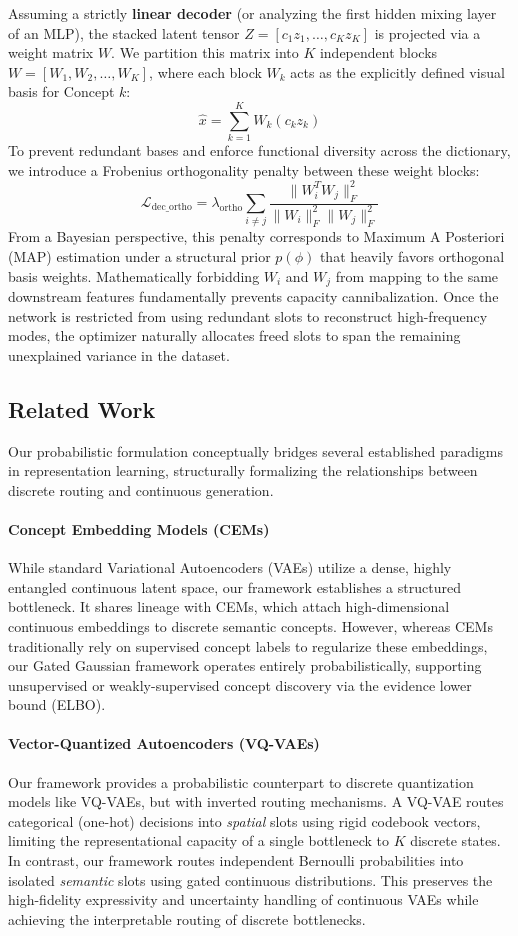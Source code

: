 \documentclass[11pt, a4paper]{article}
\begin{document}
Assuming a strictly \textbf{linear decoder} (or analyzing the first hidden mixing layer of an MLP), the stacked latent tensor $Z = [c_1 z_1, \dots, c_K z_K]$ is projected via a weight matrix $W$. We partition this matrix into $K$ independent blocks $W = [W_1, W_2, \dots, W_K]$, where each block $W_k$ acts as the explicitly defined visual basis for Concept $k$:
\[
\hat{x} = \sum_{k=1}^K W_k (c_k z_k)
\]
To prevent redundant bases and enforce functional diversity across the dictionary, we introduce a Frobenius orthogonality penalty between these weight blocks:
\[
\mathcal{L}_{\text{dec\_ortho}} = \lambda_{\text{ortho}} \sum_{i \neq j} \frac{\| W_i^T W_j \|_F^2}{\|W_i\|_F^2 \|W_j\|_F^2}
\]
From a Bayesian perspective, this penalty corresponds to Maximum A Posteriori (MAP) estimation under a structural prior $p(\phi)$ that heavily favors orthogonal basis weights. Mathematically forbidding $W_i$ and $W_j$ from mapping to the same downstream features fundamentally prevents capacity cannibalization. Once the network is restricted from using redundant slots to reconstruct high-frequency modes, the optimizer naturally allocates freed slots to span the remaining unexplained variance in the dataset.

\subsection{Related Work}

Our probabilistic formulation conceptually bridges several established paradigms in representation learning, structurally formalizing the relationships between discrete routing and continuous generation.

\paragraph{Concept Embedding Models (CEMs)}
While standard Variational Autoencoders (VAEs) utilize a dense, highly entangled continuous latent space, our framework establishes a structured bottleneck. It shares lineage with CEMs, which attach high-dimensional continuous embeddings to discrete semantic concepts. However, whereas CEMs traditionally rely on supervised concept labels to regularize these embeddings, our Gated Gaussian framework operates entirely probabilistically, supporting unsupervised or weakly-supervised concept discovery via the evidence lower bound (ELBO).

\paragraph{Vector-Quantized Autoencoders (VQ-VAEs)}
Our framework provides a probabilistic counterpart to discrete quantization models like VQ-VAEs, but with inverted routing mechanisms. A VQ-VAE routes categorical (one-hot) decisions into \textit{spatial} slots using rigid codebook vectors, limiting the representational capacity of a single bottleneck to $K$ discrete states. In contrast, our framework routes independent Bernoulli probabilities into isolated \textit{semantic} slots using gated continuous distributions. This preserves the high-fidelity expressivity and uncertainty handling of continuous VAEs while achieving the interpretable routing of discrete bottlenecks.
\end{document}
